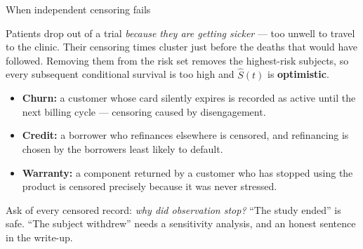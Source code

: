 \documentclass[aspectratio=169,11pt]{beamer}
\begin{document}
\begin{frame}{When independent censoring fails}
  \footnotesize
  \begin{mistake}
  \scriptsize
    Patients drop out of a trial \emph{because they are getting sicker} --- too unwell to
    travel to the clinic. Their censoring times cluster just before the deaths that would
    have followed. Removing them from the risk set removes the highest-risk subjects, so
    every subsequent conditional survival is too high and $\hat S(t)$ is
    \textbf{optimistic}.
  \end{mistake}
  \begin{readme}
    \begin{itemize}
      \item \textbf{Churn:} a customer whose card silently expires is recorded as active
            until the next billing cycle --- censoring caused by disengagement.
      \item \textbf{Credit:} a borrower who refinances elsewhere is censored, and
            refinancing is chosen by the borrowers least likely to default.
      \item \textbf{Warranty:} a component returned by a customer who has stopped using
            the product is censored precisely because it was never stressed.
    \end{itemize}
  \end{readme}
  \begin{takeaway}
    Ask of every censored record: \emph{why did observation stop?} ``The study ended''
    is safe. ``The subject withdrew'' needs a sensitivity analysis, and an honest
    sentence in the write-up.
  \end{takeaway}
\end{frame}
\end{document}
